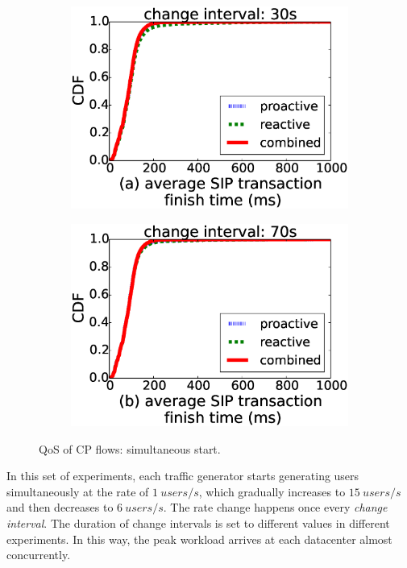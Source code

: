 \begin{figure}[!h]
  \begin{subfigure}[t]{0.49\linewidth}
   \centering
   \includegraphics[width=\columnwidth]{chap-scalims/figure/syn-cp1.eps}
  \end{subfigure}
  \begin{subfigure}[t]{0.49\linewidth}
     \centering
     \includegraphics[width=\columnwidth]{chap-scalims/figure/syn-cp2.eps}
    \end{subfigure}
\caption{QoS of CP flows: simultaneous start.}
\label{fig:syn-cp}
\end{figure}

In this set of experiments, each traffic generator starts generating users simultaneously at the rate of $1~users/s$, which gradually increases to $15~users/s$ and then decreases to $6~users/s$. The rate change happens once every \textit{change interval}. The duration of change intervals is set to different values in different experiments.
In this way, the peak workload arrives at each datacenter almost concurrently. %

